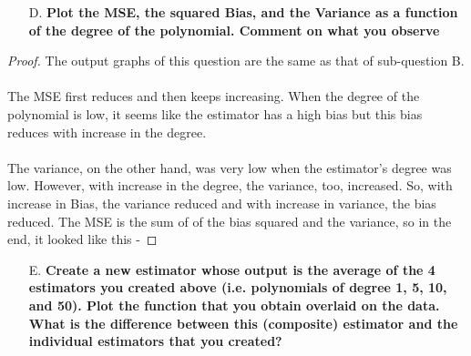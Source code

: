 \documentclass{article}
\theoremstyle{case}
\begin{document}
\begin{enumerate}
    \item [D.] \textbf{Plot the MSE, the squared Bias, and the Variance as a function
of the degree of the polynomial. Comment on what you observe}
\end{enumerate} 
\begin{proof}
The output graphs of this question are the same as that of sub-question B.\\ \\
The MSE first reduces and then keeps increasing. When the degree of the polynomial is low, it seems like the estimator has a high bias but this bias reduces with increase in the degree.\\ \\ The variance, on the other hand, was very low when the estimator's degree was low. However, with increase in the degree, the variance, too, increased. So, with increase in Bias, the variance reduced and with increase in variance, the bias reduced. The MSE is the sum of of the bias squared and the variance, so in the end, it looked like this - 
\end{proof}
\begin{enumerate}
    \item [E.] \textbf{Create a new estimator whose output is the average of the 4 estimators you created above (i.e. polynomials of degree 1, 5, 10,
and 50). Plot the function that you obtain overlaid on the data.
What is the difference between this (composite) estimator and the
individual estimators that you created?}
\end{enumerate} 
\end{document}
